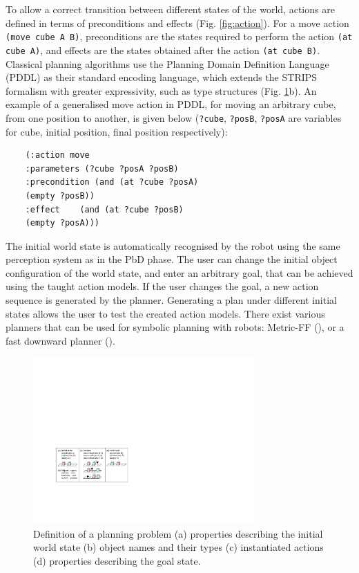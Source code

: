 To allow a correct transition between different states of the world, actions are defined in terms of {preconditions} and {effects} (Fig. \ref{fig:action}). For a move action \texttt{(move cube A B)}, preconditions are the states required to perform the action  \texttt{(at cube A)}, and effects are the states obtained after the action \texttt{(at cube B)}. Classical planning algorithms use the Planning Domain Definition Language (PDDL) \cite{ghallab2004automated} as their standard encoding language, which extends the STRIPS \cite{fikes1971strips} formalism with greater expressivity, such as type structures (Fig. \ref{fig:planning-permutation}b). An example of a generalised move action in PDDL, for moving an arbitrary cube, from one position to another, is given below (\texttt{?cube}, \texttt{?posB}, \texttt{?posA} are variables for cube, initial position, final position respectively):

\begin{small}
	\begin{verbatim}
	(:action move
	:parameters (?cube ?posA ?posB)
	:precondition (and (at ?cube ?posA)
	(empty ?posB))
	:effect    (and (at ?cube ?posB)
	(empty ?posA)))  \end{verbatim}
\end{small}

The initial world state is automatically recognised by the robot using the same perception system as in the PbD phase. 
The user can change the initial object configuration of the world state, and enter an arbitrary goal, that can be achieved using the taught action models. If the user changes the goal, a new action sequence is generated by the planner. Generating a plan under different initial states allows the user to test the created action models. There exist various planners that can be used for symbolic planning with robots: Metric-FF (\cite{cubek2015high}), or a fast downward planner (\cite{abdo2013learning}). 
\begin{figure}[t]
	\centering
	\includegraphics[width=8.5cm]{figures/planning-permutation}
	\caption{Definition of a planning problem (a) properties describing the initial world state (b) object names and their types (c) instantiated actions (d) properties describing the goal state.}
	\label{fig:planning-permutation}
\end{figure}


